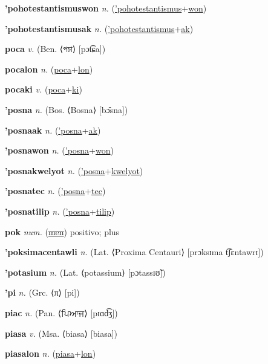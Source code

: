 \textbf{\hypertarget{'pohotestantismuswon}{'pohotestantismuswon}} \textit{n.} (\hyperlink{'pohotestantismus}{'pohotestantismus}+\allowbreak \hyperlink{won}{won})


\textbf{\hypertarget{'pohotestantismusak}{'pohotestantismusak}} \textit{n.} (\hyperlink{'pohotestantismus}{'pohotestantismus}+\allowbreak \hyperlink{ak}{ak})


\textbf{\hypertarget{poca}{poca}} \textit{v.} (Ben. ⟨{\bengali{}পচা}⟩ [pɔt͡ɕa])


\textbf{\hypertarget{pocalon}{pocalon}} \textit{n.} (\hyperlink{poca}{poca}+\allowbreak \hyperlink{lon}{lon})


\textbf{\hypertarget{pocaki}{pocaki}} \textit{v.} (\hyperlink{poca}{poca}+\allowbreak \hyperlink{ki}{ki})


\textbf{\hypertarget{'posna}{'posna}} \textit{n.} (Bos. ⟨Bosna⟩ [bɔ̂sna])


\textbf{\hypertarget{'posnaak}{'posnaak}} \textit{n.} (\hyperlink{'posna}{'posna}+\allowbreak \hyperlink{ak}{ak})


\textbf{\hypertarget{'posnawon}{'posnawon}} \textit{n.} (\hyperlink{'posna}{'posna}+\allowbreak \hyperlink{won}{won})


\textbf{\hypertarget{'posnakwelyot}{'posnakwelyot}} \textit{n.} (\hyperlink{'posna}{'posna}+\allowbreak \hyperlink{kwelyot}{kwelyot})


\textbf{\hypertarget{'posnatec}{'posnatec}} \textit{n.} (\hyperlink{'posna}{'posna}+\allowbreak \hyperlink{tec}{tec})


\textbf{\hypertarget{'posnatilip}{'posnatilip}} \textit{n.} (\hyperlink{'posna}{'posna}+\allowbreak \hyperlink{tilip}{tilip})


\textbf{\hypertarget{pok}{pok}} \textit{num.} (\hyperlink{men}{\sout{men}})
positivo; plus

\textbf{\hypertarget{'poksimacentawli}{'poksimacentawli}} \textit{n.} (Lat. ⟨Proxima Centauri⟩ [prɔksɪma t͡ʃɛntawrɪ])


\textbf{\hypertarget{'potasium}{'potasium}} \textit{n.} (Lat. ⟨potassium⟩ [pɔtassɪʊ̃])


\textbf{\hypertarget{'pi}{'pi}} \textit{n.} (Grc. ⟨π⟩ [pi])


\textbf{\hypertarget{piac}{piac}} \textit{n.} (Pan. ⟨{\gurmukhi{}ਪਿਆਜ}⟩ [pɪɑd͡ʒ])


\textbf{\hypertarget{piasa}{piasa}} \textit{v.} (Msa. ⟨biasa⟩ [biasa])


\textbf{\hypertarget{piasalon}{piasalon}} \textit{n.} (\hyperlink{piasa}{piasa}+\allowbreak \hyperlink{lon}{lon})


